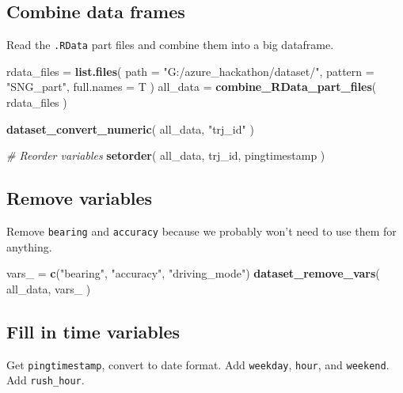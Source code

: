 \documentclass[]{article}
\newenvironment{Shaded}{\begin{snugshade}}{\end{snugshade}}
\newcommand{\CommentTok}[1]{\textcolor[rgb]{0.56,0.35,0.01}{\textit{#1}}}
\newcommand{\DataTypeTok}[1]{\textcolor[rgb]{0.13,0.29,0.53}{#1}}
\newcommand{\KeywordTok}[1]{\textcolor[rgb]{0.13,0.29,0.53}{\textbf{#1}}}
\newcommand{\NormalTok}[1]{#1}
\newcommand{\StringTok}[1]{\textcolor[rgb]{0.31,0.60,0.02}{#1}}
\begin{document}
\hypertarget{combine-data-frames}{%
\subsection{Combine data frames}\label{combine-data-frames}}

Read the \texttt{.RData} part files and combine them into a big
dataframe.

\begin{Shaded}
\begin{Highlighting}[]
\NormalTok{rdata_files =}\StringTok{ }\KeywordTok{list.files}\NormalTok{( }\DataTypeTok{path =} \StringTok{"G:/azure_hackathon/dataset/"}\NormalTok{,}
    \DataTypeTok{pattern =} \StringTok{"SNG_part"}\NormalTok{, }\DataTypeTok{full.names =}\NormalTok{ T )}
\NormalTok{all_data =}\StringTok{ }\KeywordTok{combine_RData_part_files}\NormalTok{( rdata_files )}

\KeywordTok{dataset_convert_numeric}\NormalTok{( all_data, }\StringTok{"trj_id"}\NormalTok{ )}

\CommentTok{# Reorder variables}
\KeywordTok{setorder}\NormalTok{( all_data, trj_id, pingtimestamp )}
\end{Highlighting}
\end{Shaded}

\hypertarget{remove-variables}{%
\subsection{Remove variables}\label{remove-variables}}

Remove \texttt{bearing} and \texttt{accuracy} because we probably won't
need to use them for anything.

\begin{Shaded}
\begin{Highlighting}[]
\NormalTok{vars_ =}\StringTok{ }\KeywordTok{c}\NormalTok{(}\StringTok{"bearing"}\NormalTok{, }\StringTok{"accuracy"}\NormalTok{, }\StringTok{"driving_mode"}\NormalTok{)}
\KeywordTok{dataset_remove_vars}\NormalTok{( all_data, vars_ )}
\end{Highlighting}
\end{Shaded}

\hypertarget{fill-in-time-variables}{%
\subsection{Fill in time variables}\label{fill-in-time-variables}}

Get \texttt{pingtimestamp}, convert to date format. Add
\texttt{weekday}, \texttt{hour}, and \texttt{weekend}. Add
\texttt{rush\_hour}.
\end{document}
